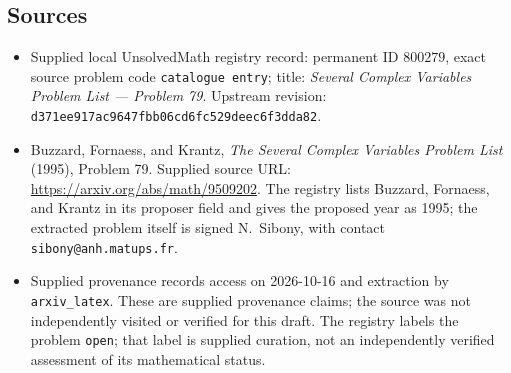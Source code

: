 \documentclass[11pt]{article}
\begin{document}
\subsection{Sources}
\begin{itemize}
\item Supplied local UnsolvedMath registry record: permanent ID \(800279\), exact source problem code \texttt{catalogue entry}; title: \emph{Several Complex Variables Problem List --- Problem 79}. Upstream revision: \texttt{d371ee917ac9647fbb06cd6fc529deec6f3dda82}.
\item Buzzard, Fornaess, and Krantz, \emph{The Several Complex Variables Problem List} (1995), Problem 79. Supplied source URL: \url{https://arxiv.org/abs/math/9509202}. The registry lists Buzzard, Fornaess, and Krantz in its proposer field and gives the proposed year as 1995; the extracted problem itself is signed N.~Sibony, with contact \texttt{sibony@anh.matups.fr}.
\item Supplied provenance records access on 2026-10-16 and extraction by \texttt{arxiv\_latex}. These are supplied provenance claims; the source was not independently visited or verified for this draft. The registry labels the problem \texttt{open}; that label is supplied curation, not an independently verified assessment of its mathematical status.
\end{itemize}
\end{document}
